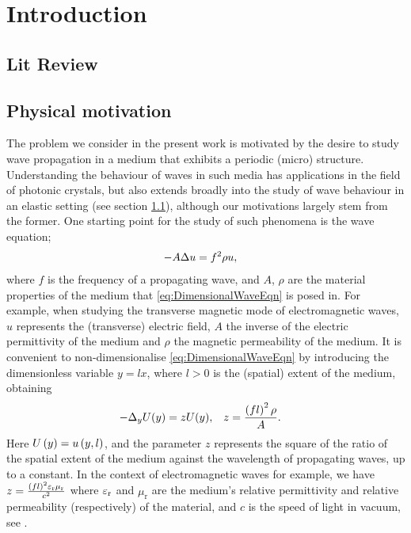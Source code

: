 \section{Introduction} \label{sec:Intro}


\subsection{Lit Review} \label{ssec:LitReview}

\subsection{Physical motivation} \label{ssec:PhysMot}
The problem we consider in the present work is motivated by the desire to study wave propagation in a medium that exhibits a periodic (micro) structure.
Understanding the behaviour of waves in such media has applications in the field of photonic crystals, but also extends broadly into the study of wave behaviour in an elastic setting (see section \ref{ssec:LitReview}), although our motivations largely stem from the former.
One starting point for the study of such phenomena is the wave equation;
\begin{align} \label{eq:DimensionalWaveEqn}
	-A \Delta u &= f^2 \rho u,
\end{align}
where $f$ is the frequency of a propagating wave, and $A$, $\rho$ are the material properties of the medium that \eqref{eq:DimensionalWaveEqn} is posed in.
For example, when studying the transverse magnetic mode of electromagnetic waves, $u$ represents the (transverse) electric field, $A$ the inverse of the electric permittivity of the medium and $\rho$ the magnetic permeability of the medium.
It is convenient to non-dimensionalise \eqref{eq:DimensionalWaveEqn} by introducing the dimensionless variable $y=lx$, where $l>0$ is the (spatial) extent of the medium, obtaining
\begin{align} \label{eq:NonDimensionalWaveEqn}
	-\Delta_{y} U(y) = z U(y), &\quad z = \frac{\left( fl \right)^2 \rho }{A}.
\end{align}
Here $U\left( y \right) = u\left( y,l \right)$, and the parameter $z$ represents the square of the ratio of the spatial extent of the medium against the wavelength of propagating waves, up to a constant.
In the context of electromagnetic waves for example, we have $z = \frac{\left( fl \right)^2 \varepsilon_\mathrm{r}\mu_\mathrm{r}}{c^2}$ where $\varepsilon_\mathrm{r}$ and $\mu_\mathrm{r}$ are the medium's relative permittivity and relative permeability (respectively) of the material, and $c$ is the speed of light in vacuum, see .

